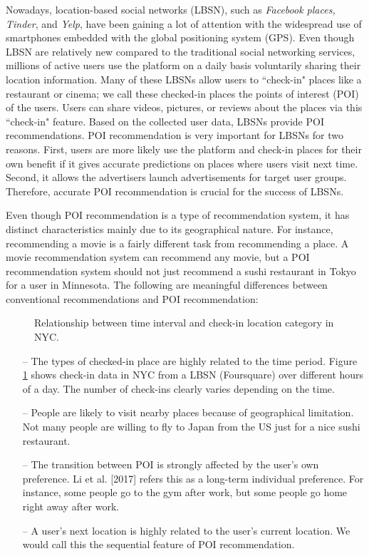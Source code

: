 \documentclass{sig-alternate}
\begin{document}
Nowadays, location-based social networks (LBSN), such as \emph{Facebook places, Tinder},  and \emph{Yelp}, 
have been gaining a lot of attention with the widespread use of smartphones embedded with the 
global positioning system (GPS). Even though LBSN are relatively new compared to 
the traditional social networking services, millions of active users use the platform on a daily basis voluntarily sharing 
their location information. Many of these LBSNs allow users to ``check-in" 
places like a restaurant or cinema; we call these checked-in places the points of interest (POI) 
of the users. Users can share videos, pictures, or reviews about the places via this ``check-in" 
feature. Based on the collected user data, LBSNs provide POI recommendations. POI recommendation 
is very important for LBSNs for two reasons. First, users are more likely use the platform and check-in places 
for their own benefit if it gives accurate predictions on places where users visit next time. 
Second, it allows the advertisers launch advertisements for target user groups. Therefore, 
accurate POI recommendation is crucial for the success of LBSNs.

Even though POI recommendation is a type of recommendation system, it has distinct characteristics 
mainly due to its geographical nature. For instance, recommending a movie is a fairly different task from 
recommending a place. A movie recommendation system can recommend any movie, but a POI recommendation 
system should not just recommend a sushi restaurant in Tokyo for a user in Minnesota. The following are 
meaningful differences between conventional recommendations and POI recommendation:

\begin{figure}
\centering
{}
\caption{Relationship between time interval and check-in location category in NYC.}
\label{fig:NYC_checkIn}
\end{figure}

\begin{itemize}
\item[--] The types of checked-in place are highly related to the time period. Figure \ref{fig:NYC_checkIn} shows check-in data in 
NYC from a LBSN (Foursquare) over different hours of a day. The number of check-ins clearly varies depending 
on the time.
\item[--] People are likely to visit nearby places because of geographical limitation. Not many people are willing 
to fly to Japan from the US just for a nice sushi restaurant.
\item[--] The transition between POI is strongly affected by the user's own preference. Li et al. [2017] refers this as a long-term individual preference. For instance, some people go to the gym after work, but some people go home right away after work. 
\item[--] A user's next location is highly related to the user's current location. We would call this the sequential feature of POI recommendation. 
\end{itemize}
\end{document}

